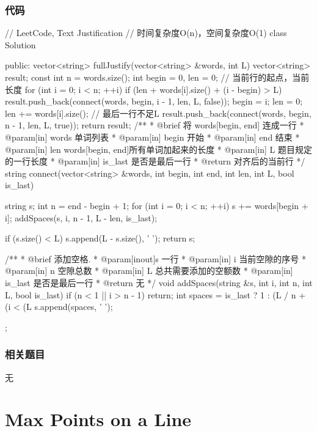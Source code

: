 \subsubsection{代码}
\begin{Code}
// LeetCode, Text Justification
// 时间复杂度O(n)，空间复杂度O(1)
class Solution {
public:
    vector<string> fullJustify(vector<string> &words, int L) {
        vector<string> result;
        const int n = words.size();
        int begin = 0, len = 0; // 当前行的起点，当前长度
        for (int i = 0; i < n; ++i) {
            if (len + words[i].size() + (i - begin) > L) {
                result.push_back(connect(words, begin, i - 1, len, L, false));
                begin = i;
                len = 0;
            }
            len += words[i].size();
        }
        // 最后一行不足L
        result.push_back(connect(words, begin, n - 1, len, L, true));
        return result;
    }
    /**
     * @brief 将 words[begin, end] 连成一行
     * @param[in] words 单词列表
     * @param[in] begin 开始
     * @param[in] end 结束
     * @param[in] len words[begin, end]所有单词加起来的长度
     * @param[in] L 题目规定的一行长度
     * @param[in] is_last 是否是最后一行
     * @return 对齐后的当前行
     */
    string connect(vector<string> &words, int begin, int end,
            int len, int L, bool is_last) {
        string s;
        int n = end - begin + 1;
        for (int i = 0; i < n; ++i) {
            s += words[begin + i];
            addSpaces(s, i, n - 1, L - len, is_last);
        }

        if (s.size() < L) s.append(L - s.size(), ' ');
        return s;
    }

    /**
     * @brief 添加空格.
     * @param[inout]s 一行
     * @param[in] i 当前空隙的序号
     * @param[in] n 空隙总数
     * @param[in] L 总共需要添加的空额数
     * @param[in] is_last 是否是最后一行
     * @return 无
     */
    void addSpaces(string &s, int i, int n, int L, bool is_last) {
        if (n < 1 || i > n - 1) return;
        int spaces = is_last ? 1 : (L / n + (i < (L %
        s.append(spaces, ' ');
    }
};
\end{Code}


\subsubsection{相关题目}
\begindot
\item 无
\myenddot


\section{Max Points on a Line} %
\label{sec:Max-Points-on-a-Line}


